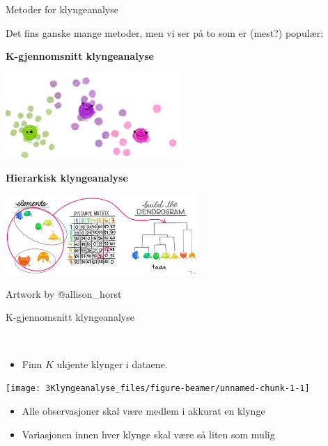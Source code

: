 \documentclass[10pt,ignorenonframetext,]{beamer}
\providecommand{\tightlist}{%
  \setlength{\itemsep}{0pt}\setlength{\parskip}{0pt}}
\begin{document}
\begin{frame}{Metoder for klyngeanalyse}
\protect\hypertarget{metoder-for-klyngeanalyse}{}

Det fins ganske mange metoder, men vi ser på to som er (mest?) populær:

\textbf{K-gjennomsnitt klyngeanalyse}

\centering

\includegraphics[width=0.5\textwidth,height=\textheight]{kmeans_AllisonHorst.png}

\flushleft

\textbf{Hierarkisk klyngeanalyse}

\centering

\includegraphics[width=0.55\textwidth,height=\textheight]{hierclust_AllisonHorst.png}

\tiny Artwork by @allison\_horst

\end{frame}

\begin{frame}

\begin{block}{K-gjennomsnitt klyngeanalyse}

\(~\)

\begin{itemize}
\tightlist
\item
  Finn \(K\) ukjente klynger i dataene.
\end{itemize}

\vspace{2mm}

\centering

\texttt{[image: 3Klyngeanalyse\_files/figure-beamer/unnamed-chunk-1-1]}

\begin{itemize}
\tightlist
\item
  Alle observasjoner skal være medlem i akkurat en klynge
\item
  Variasjonen innen hver klynge skal være så liten som mulig
\end{itemize}

\end{block}

\end{frame}
\end{document}
